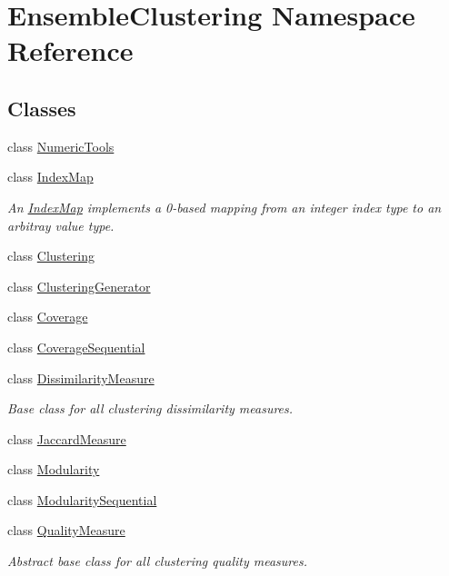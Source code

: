 \hypertarget{namespace_ensemble_clustering}{\section{Ensemble\-Clustering Namespace Reference}
\label{namespace_ensemble_clustering}
}
\subsection*{Classes}
\begin{DoxyCompactItemize}
\item 
class \hyperlink{class_ensemble_clustering_1_1_numeric_tools}{Numeric\-Tools}
\item 
class \hyperlink{class_ensemble_clustering_1_1_index_map}{Index\-Map}
\begin{DoxyCompactList}\small\item\em An \hyperlink{class_ensemble_clustering_1_1_index_map}{Index\-Map} implements a 0-\/based mapping from an integer index type to an arbitray value type. \end{DoxyCompactList}\item 
class \hyperlink{class_ensemble_clustering_1_1_clustering}{Clustering}
\item 
class \hyperlink{class_ensemble_clustering_1_1_clustering_generator}{Clustering\-Generator}
\item 
class \hyperlink{class_ensemble_clustering_1_1_coverage}{Coverage}
\item 
class \hyperlink{class_ensemble_clustering_1_1_coverage_sequential}{Coverage\-Sequential}
\item 
class \hyperlink{class_ensemble_clustering_1_1_dissimilarity_measure}{Dissimilarity\-Measure}
\begin{DoxyCompactList}\small\item\em Base class for all clustering dissimilarity measures. \end{DoxyCompactList}\item 
class \hyperlink{class_ensemble_clustering_1_1_jaccard_measure}{Jaccard\-Measure}
\item 
class \hyperlink{class_ensemble_clustering_1_1_modularity}{Modularity}
\item 
class \hyperlink{class_ensemble_clustering_1_1_modularity_sequential}{Modularity\-Sequential}
\item 
class \hyperlink{class_ensemble_clustering_1_1_quality_measure}{Quality\-Measure}
\begin{DoxyCompactList}\small\item\em Abstract base class for all clustering quality measures. \end{DoxyCompactList}\item 

\end{DoxyCompactItemize}
